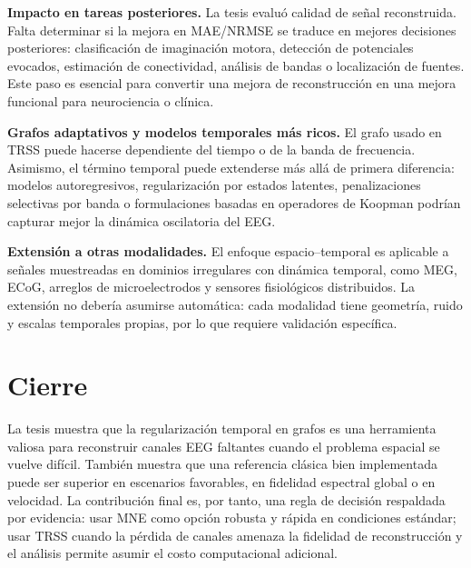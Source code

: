 \textbf{Impacto en tareas posteriores.} La tesis evaluó calidad de señal reconstruida. Falta determinar si la mejora en MAE/NRMSE se traduce en mejores decisiones posteriores: clasificación de imaginación motora, detección de potenciales evocados, estimación de conectividad, análisis de bandas o localización de fuentes. Este paso es esencial para convertir una mejora de reconstrucción en una mejora funcional para neurociencia o clínica.

\textbf{Grafos adaptativos y modelos temporales más ricos.} El grafo usado en TRSS puede hacerse dependiente del tiempo o de la banda de frecuencia. Asimismo, el término temporal puede extenderse más allá de primera diferencia: modelos autoregresivos, regularización por estados latentes, penalizaciones selectivas por banda o formulaciones basadas en operadores de Koopman podrían capturar mejor la dinámica oscilatoria del EEG.

\textbf{Extensión a otras modalidades.} El enfoque espacio--temporal es aplicable a señales muestreadas en dominios irregulares con dinámica temporal, como MEG, ECoG, arreglos de microelectrodos y sensores fisiológicos distribuidos. La extensión no debería asumirse automática: cada modalidad tiene geometría, ruido y escalas temporales propias, por lo que requiere validación específica.

\section{Cierre}

La tesis muestra que la regularización temporal en grafos es una herramienta valiosa para reconstruir canales EEG faltantes cuando el problema espacial se vuelve difícil. También muestra que una referencia clásica bien implementada puede ser superior en escenarios favorables, en fidelidad espectral global o en velocidad. La contribución final es, por tanto, una regla de decisión respaldada por evidencia: usar MNE como opción robusta y rápida en condiciones estándar; usar TRSS cuando la pérdida de canales amenaza la fidelidad de reconstrucción y el análisis permite asumir el costo computacional adicional.
